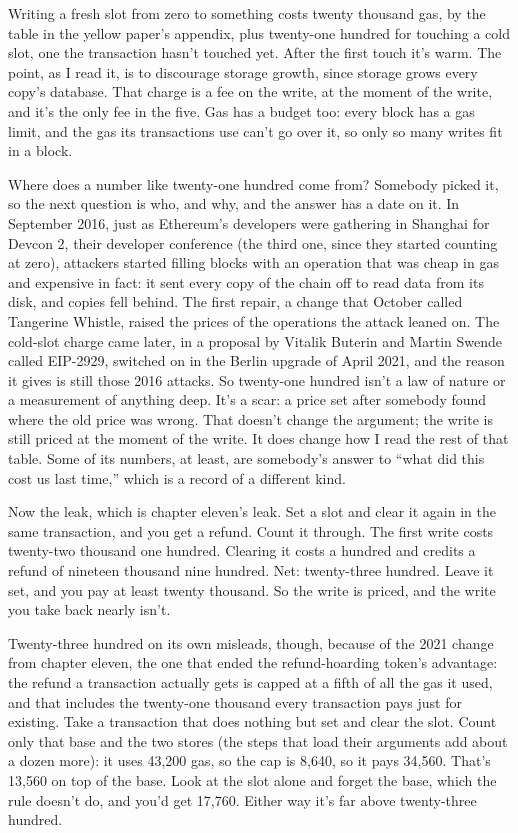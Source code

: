 \documentclass[11pt,twoside]{article}
\theoremstyle{thielethm}
\theoremstyle{thieledef}
\theoremstyle{thieledef}
\theoremstyle{thieledef}
\theoremstyle{thielethm}
\theoremstyle{thieleobs}
\theoremstyle{thielethm}
\begin{document}
Writing a fresh slot from zero to something costs twenty thousand gas, by the table in the yellow paper's appendix, plus twenty-one hundred for touching a cold slot, one the transaction hasn't touched yet. After the first touch it's warm. The point, as I read it, is to discourage storage growth, since storage grows every copy's database. That charge is a fee on the write, at the moment of the write, and it's the only fee in the five. Gas has a budget too: every block has a gas limit, and the gas its transactions use can't go over it, so only so many writes fit in a block.

Where does a number like twenty-one hundred come from? Somebody picked it, so the next question is who, and why, and the answer has a date on it. In September 2016, just as Ethereum's developers were gathering in Shanghai for Devcon 2, their developer conference (the third one, since they started counting at zero), attackers started filling blocks with an operation that was cheap in gas and expensive in fact: it sent every copy of the chain off to read data from its disk, and copies fell behind. The first repair, a change that October called Tangerine Whistle, raised the prices of the operations the attack leaned on. The cold-slot charge came later, in a proposal by Vitalik Buterin and Martin Swende called EIP-2929, switched on in the Berlin upgrade of April 2021, and the reason it gives is still those 2016 attacks. So twenty-one hundred isn't a law of nature or a measurement of anything deep. It's a scar: a price set after somebody found where the old price was wrong. That doesn't change the argument; the write is still priced at the moment of the write. It does change how I read the rest of that table. Some of its numbers, at least, are somebody's answer to ``what did this cost us last time,'' which is a record of a different kind.

Now the leak, which is chapter eleven's leak. Set a slot and clear it again in the same transaction, and you get a refund. Count it through. The first write costs twenty-two thousand one hundred. Clearing it costs a hundred and credits a refund of nineteen thousand nine hundred. Net: twenty-three hundred. Leave it set, and you pay at least twenty thousand. So the write is priced, and the write you take back nearly isn't.

Twenty-three hundred on its own misleads, though, because of the 2021 change from chapter eleven, the one that ended the refund-hoarding token's advantage: the refund a transaction actually gets is capped at a fifth of all the gas it used, and that includes the twenty-one thousand every transaction pays just for existing. Take a transaction that does nothing but set and clear the slot. Count only that base and the two stores (the steps that load their arguments add about a dozen more): it uses 43,200 gas, so the cap is 8,640, so it pays 34,560. That's 13,560 on top of the base. Look at the slot alone and forget the base, which the rule doesn't do, and you'd get 17,760. Either way it's far above twenty-three hundred.
\end{document}
